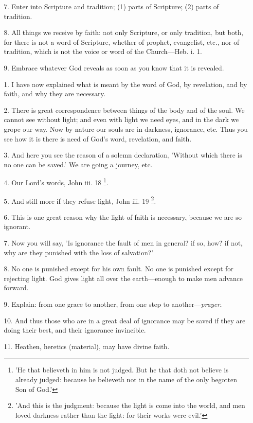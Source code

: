 7. Enter into Scripture and tradition; (1) parts
of Scripture; (2) parts of tradition.

8. All things we receive by faith: not only
Scripture, or only tradition, but both, for there is not a word of
Scripture, whether of prophet, evangelist, etc., nor of tradition,
which is not the voice or word of the Church—Heb. i. 1.

9. Embrace whatever God reveals as soon as you
know that it is revealed.


1. I have now explained what is meant by the word
of God, by revelation, and by faith, and why they are necessary.

2. There is great correspondence between things
of the body and of the soul. We cannot see without light; and even
with light we need eyes, and in the dark we grope our way. Now by
nature our souls are in darkness, ignorance, etc. Thus you see how it
is there is need of God's word, revelation, and faith.

3. And here you see the reason of a solemn
declaration, 'Without which there is no one can be saved.' We are
going a journey, etc.

4. Our Lord's words, John iii. 18 \footnote{'He that believeth in
him is not judged. But he that doth not believe is already judged:
because he believeth not in the name of the only begotten Son of God.'}.

5. And still more if they refuse light, John iii.
19 \footnote{'And this is the
judgment: because the light is come into the world, and men loved
darkness rather than the light: for their works were evil.'}.

6. This is one great reason why the light of
faith is necessary, because we are so ignorant.

7. Now you will say, 'Is ignorance the fault of
men in general? if so, how? if not, why are they punished with the
loss of salvation?'

8. No one is punished except for his own fault.
No one is punished except for rejecting light. God gives light all
over the earth—enough to make men advance forward.

9. Explain: from one grace to another, from one
step to another—\emph{prayer}.

10. And thus those who are in a great deal of
ignorance may be saved if they are doing their best, and their
ignorance invincible.

11. Heathen, heretics (material), may have divine
faith.

